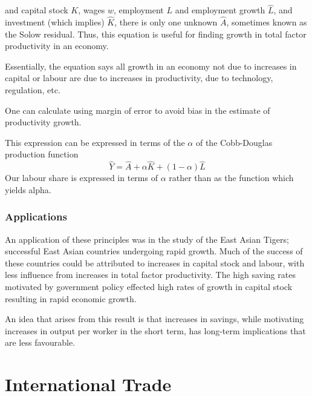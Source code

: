 \documentclass[12pt]{report}
\begin{document}
\begin{flushleft}
and capital stock \(K\), wages \(w\), employment \(L\) and employment growth
\(\hat{L}\), and investment (which implies) \(\hat{K}\), there is only one
unknown \(\hat{A}\), sometimes known as the Solow residual. Thus, this equation
is useful for finding growth in total factor productivity in an economy. \par
Essentially, the equation says all growth in an economy not due to increases
in capital or labour are due to increases in productivity, due to technology,
regulation, etc. \par
One can calculate using margin of error to avoid bias in the estimate of
productivity growth. \par
This expression can be expressed in terms of the \(\alpha\) of the Cobb-Douglas
production function
\[\hat{Y} = \hat{A} + \alpha\hat{K} + (1 - \alpha)\hat{L}\]
Our labour share is expressed in terms of \(\alpha\) rather than as the
function which yields alpha.

\subsubsection*{Applications}

An application of these principles was in the study of the East Asian Tigers;
successful East Asian countries undergoing rapid growth. Much of the success of
these countries could be attributed to increases in capital stock and labour,
with less influence from increases in total factor productivity. The high
saving rates motivated by government policy effected high rates of growth in
capital stock resulting in rapid economic growth. \par
An idea that arises from this result is that increases in savings, while
motivating increases in output per worker in the short term, has long-term
implications that are less favourable.

\section*{International Trade}


\end{flushleft}
\end{document}
